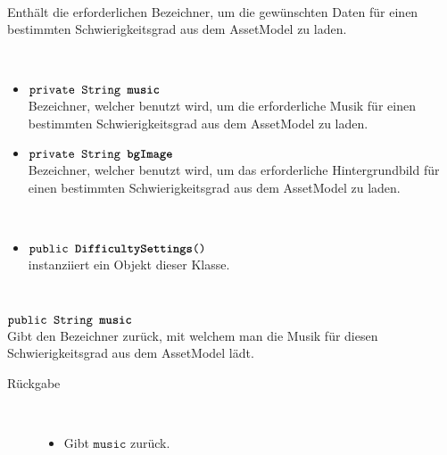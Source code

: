 \begin{description}
\item[Beschreibung] \hfill \\ Enthält die erforderlichen Bezeichner, um die gewünschten Daten für einen bestimmten Schwierigkeitsgrad aus dem AssetModel zu laden.
\item[Attribute] \hfill \\
	\vspace{-.8cm}
	\begin{itemize}	
		\item $\texttt{private String \textbf{music}}$ \\ Bezeichner, welcher benutzt wird, um die erforderliche Musik für einen bestimmten Schwierigkeitsgrad aus dem AssetModel zu laden.
		\item $\texttt{private String \textbf{bgImage}}$ \\ Bezeichner, welcher benutzt wird, um das erforderliche Hintergrundbild für einen bestimmten Schwierigkeitsgrad aus dem AssetModel zu laden.


		\end{itemize}
	
\item[Konstruktoren] \hfill \\
	\vspace{-.8cm}
	\begin{itemize}
		\item $\texttt{public \textbf{DifficultySettings}()}$ \\ instanziiert ein Objekt dieser Klasse.

	\end{itemize}
	
\item[Methoden] \hfill \\
	\vspace{-.8cm}
		\item $\texttt{public String \textbf{music}}$ \\ Gibt den Bezeichner zurück, mit welchem man die Musik für diesen Schwierigkeitsgrad aus dem AssetModel lädt.
		\begin{description}
			\item[Rückgabe] \hfill \\
			\vspace{-.8cm}
			\begin{itemize}
				\item Gibt $\texttt{music}$ zurück.
			\end{itemize}
			\end{description}
			

\end{description}
